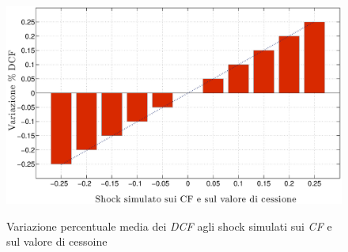 \begin{figure}[htbp]
\begin{center}
{\includegraphics[scale=0.40]{Grafici/Terzo/varvcf2.eps}}
\caption[Variazione media \% dei \textit{DCF} vs $\Delta$ di \textit{CF} e valore di cessione]{Variazione percentuale media dei \textit{DCF} agli shock simulati sui \textit{CF} e sul valore di cessoine}
\label{graf:varvcf2}
\end{center}
\end{figure}